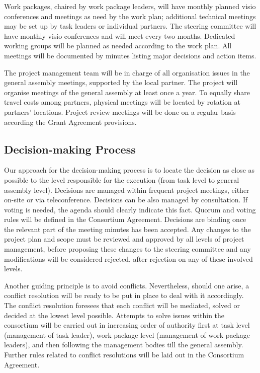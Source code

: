 Work packages, chaired by work package leaders, will have monthly
planned visio conferences and meetings as need by the work plan;
additional technical meetings may be set up by task leaders or
individual partners. The steering committee will have monthly visio
conferences and will meet every two months. Dedicated working groups will
be planned as needed according to the work plan.  All meetings will be
documented by minutes listing major decisions and action items.


The project management team will be in charge of all organisation
issues in the general assembly meetings, supported by the local
partner. The project will organise meetings of the general assembly at
least once a year. To equally share travel costs among partners,
physical meetings will be located by rotation at partners’
locations. Project review meetings will be done on a regular basis
according the Grant Agreement provisions.

\subsection{Decision-making Process}

Our approach for the decision-making process is to locate the decision
as close as possible to the level responsible for the execution (from
task level to general assembly level). Decisions are managed within
frequent project meetings, either on-site or via
teleconference. Decisions can be also managed by consultation. If
voting is needed, the agenda should clearly indicate this fact. Quorum
and voting rules will be defined in the Consortium
Agreement. Decisions are binding once the relevant part of the meeting
minutes has been accepted. Any changes to the project plan and scope
must be reviewed and approved by all levels of project management,
before proposing these changes to the steering committee and any
modifications will be considered rejected, after rejection on any of
these involved levels.

Another guiding principle is to avoid conflicts. Nevertheless, should
one arise, a conflict resolution will be ready to be put in place to
deal with it accordingly. The conflict resolution foresees that each
conflict will be mediated, solved or decided at the lowest level
possible. Attempts to solve issues within the consortium will be
carried out in increasing order of authority first at task level
(management of task leader), work package level (management of work
package leaders), and then following the management bodies till the
general assembly. Further rules related to conflict resolutions will
be laid out in the Consortium Agreement.

